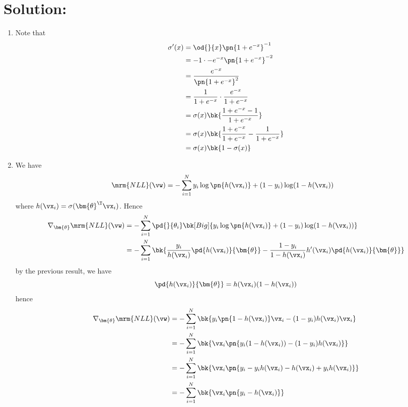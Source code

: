 \documentclass[189]{pset}
\begin{document}
  \section*{Solution:}
  \begin{enumerate}
    \item Note that
      \begin{align*}
        \sigma'(x)
        &= \od{}{x} \pn{1+e^{-x}}^{-1} \\
        &= -1\cdot -e^{-x} \pn{1+e^{-x}}^{-2} \\
        &= \frac{e^{-x}}{\pn{1+e^{-x}}^2} \\
        &= \frac{1}{1+e^{-x}} \cdot \frac{e^{-x}}{1 + e^{-x}} \\
        &= \sigma(x)\bk{\frac{1+e^{-x} - 1}{1+e^{-x}}} \\
        &= \sigma(x)\bk{\frac{1+e^{-x}}{1+e^{-x}} -
          \frac{1}{1+e^{-x}}} \\
        &= \sigma(x)\bk{1-\sigma(x)}
      \end{align*}
    \item We have
      \begin{align*}
        \mrm{NLL}(\vw)
        &= -\sum_{i=1}^N y_i \log\pn{h(\vx_i)} + (1-y_i)\log(1-
          h(\vx_i))
      \end{align*}
      where $h(\vx_i)=\sigma(\bm{\theta}^\T \vx_i)$. Hence
      \begin{align*}
        \nabla_{\bm{\theta}} \mrm{NLL}(\vw)
        &= -\sum_{i=1}^N \pd{}{\theta_i} \bk[Big]{ y_i
          \log\pn{h(\vx_i)} + (1-y_i)\log(1- h(\vx_i)) } \\
        &= -\sum_{i=1}^N\bk{\frac{y_i}{h(\vx_i)}\pd{h(\vx_i)}{
          \bm{\theta}} - \frac{1-y_i}{1- h(\vx_i)}h'(\vx_i)
          \pd{h(\vx_i)}{\bm{\theta}}}
      \end{align*}
      by the previous result, we have
      \[
        \pd{h(\vx_i)}{\bm{\theta}} = h(\vx_i)(1-h(\vx_i))
      \]
      hence
      \begin{align*}
        \nabla_{\bm{\theta}} \mrm{NLL}(\vw)
        &= -\sum_{i=1}^N \bk{y_i\pn{1-h(\vx_i)}\vx_i-(1-y_i)h(\vx_i)
          \vx_i} \\
        &= -\sum_{i=1}^N \bk{\vx_i \pn{y_i(1-h(\vx_i)) - (1-y_i)
          h(\vx_i)}} \\
        &= -\sum_{i=1}^N \bk{\vx_i\pn{y_i - y_ih(\vx_i) - h(\vx_i) +
          y_i h(\vx_i)}} \\
        &= -\sum_{i=1}^N \bk{\vx_i \pn{y_i - h(\vx_i)}} \\

\end{align*}
\end{enumerate}
\end{document}
